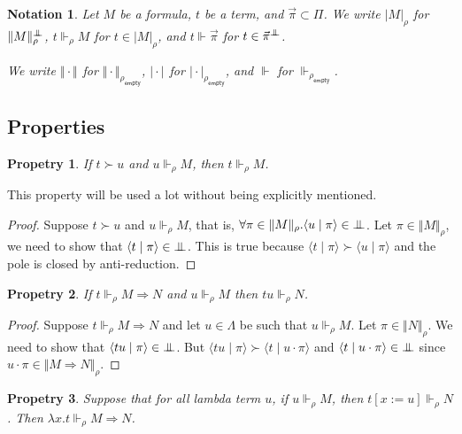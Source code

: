 \documentclass{article}
\newcommand{\proc}[2]{\langle{#1}\mid{#2}\rangle}
\newcommand{\pole}{{\bot\mkern-10mu\bot}}
\newcommand{\realizes}{\Vdash}
\newcommand{\terminterp}[2]{\Vert #1 \Vert_{#2}}
\newcommand{\truthinterp}[2]{\vert #1 \vert_{#2}}
\newcommand{\emptyval}{{\rho_\mathsf{empty}}}
\newtheorem{property}{Propetry}
\newtheorem{notation}{Notation}
\begin{document}
\begin{notation}
    Let $M$ be a formula, $t$ be a term, and $\vec\pi \subset \Pi$.
    We write $\truthinterp{M}{\rho}$ for $\terminterp{M}{\rho}^\pole$, $t \realizes_\rho M$ for $t \in \truthinterp{M}{\rho}$, and $t \realizes \vec\pi$ for $t \in \vec\pi^\pole$.

    We write $\terminterp{\cdot}{}$ for $\terminterp{\cdot}{\emptyval}$, $\truthinterp{\cdot}{}$ for $\truthinterp{\cdot}{\emptyval}$, and $\realizes$ for $\realizes_\emptyval$.
\end{notation}

\subsection{Properties}

\begin{property}\label{antired}
    If $t \succ u$ and $u \realizes_\rho M$, then $t \realizes_\rho M$.
\end{property}

This property will be used a lot without being explicitly mentioned.

\begin{proof}
    Suppose $t \succ u$ and $u \realizes_\rho M$, that is, $\forall \pi \in \terminterp{M}{\rho}. \proc{u}{\pi} \in \pole$.
    Let $\pi \in \terminterp{M}{\rho}$, we need to show that $\proc{t}{\pi} \in \pole$.
    This is true because $\proc{t}{\pi} \succ \proc{u}{\pi}$ and the pole is closed by anti-reduction.
\end{proof}

\begin{property}\label{implieselim}
    If $t \realizes_\rho M \Rightarrow N$ and $u \realizes_\rho M$ then $t u \realizes_\rho N$.
\end{property}

\begin{proof}
    Suppose $t \realizes_\rho M \Rightarrow N$ and let $u \in \Lambda$ be such that $u \realizes_\rho M$.
    Let $\pi \in \terminterp{N}{\rho}$.
    We need to show that $\proc{tu}{\pi} \in \pole$.
    But $\proc{tu}{\pi} \succ \proc{t}{u \cdot \pi}$ and $\proc{t}{u \cdot \pi} \in \pole$ since $u \cdot \pi \in \terminterp{M \Rightarrow N}{\rho}$.    
\end{proof}

\begin{property}\label{impliesintro}
    Suppose that for all lambda term $u$, if $u \realizes_\rho M$, then $t[x := u] \realizes_\rho N$.
    Then $\lambda x. t \realizes_\rho M \Rightarrow N$.
\end{property}
\end{document}
